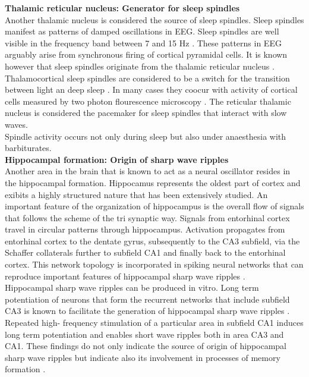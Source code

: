 \textbf{Thalamic reticular nucleus: Generator for sleep spindles}\\
 Another thalamic nucleus is considered the source of sleep spindles. Sleep spindles manifest as patterns of damped oscillations in EEG. Sleep spindles are well visible in the frequency band between 7 and 15 Hz \parencite{niethard2018cortical}. These patterns in EEG arguably arise from synchronous firing of cortical pyramidal cells. It is known however that sleep spindles originate from the thalamic reticular nucleus \parencite{luthi2014sleep}. Thalamocortical sleep spindles are considered to be a switch for the transition between light an deep sleep \parencite{montagna2005fatal}. In many cases they coocur with activity of cortical cells measured by two photon flourescence microscopy \parencite{niethard2018cortical}. The reticular thalamic nucleus is considered the pacemaker for sleep spindles that interact with slow waves.\\
 Spindle activity occurs not only during sleep but also under anaesthesia with barbiturates.\\

\textbf{Hippocampal formation: Origin of sharp wave ripples}\\
Another area in the brain that is known to act as a neural oscillator resides in the hippocampal formation. Hippocamus represents the oldest part of cortex and exibits a highly structured nature that has been extensively studied. An important feature of the organization of hippocampus is the overall flow of signals that follows the scheme of the tri synaptic way. Signals from entorhinal cortex travel in circular patterns through hippocampus. Activation propagates from entorhinal cortex to the dentate gyrus, subsequently to the CA3 subfield, via the Schaffer collaterals further to subfield CA1 and finally back to the entorhinal cortex. This network topology is incorporated in spiking neural networks that can reproduce important features of hippocampal sharp wave ripples \parencite{aussel2018detailed}.\\
Hippocampal sharp wave ripples can be produced in vitro. Long term potentiation of neurons that form the recurrent networks that include subfield CA3 is known to facilitate the generation of hippocampal sharp wave ripples . Repeated high- frequency stimulation of a particular area in subfield CA1 induces long term potentiation and enables short wave ripples both in area CA3 and CA1. These findings do not only indicate the source of origin of hippocampal sharp wave ripples but indicate also its involvement in processes of memory formation \parencite{behrens2005induction}.\\

